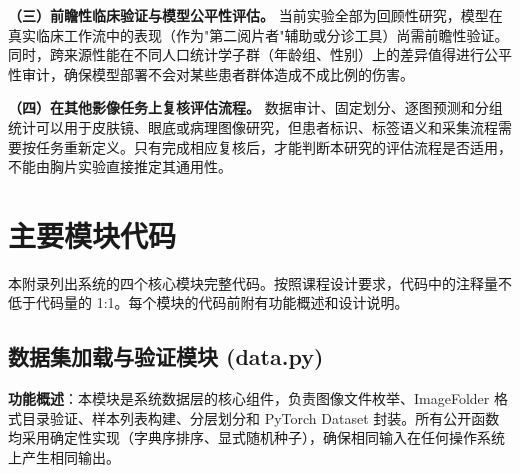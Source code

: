 \documentclass[12pt,a4paper,UTF8,openany]{ctexbook}
\begin{document}
\textbf{（三）前瞻性临床验证与模型公平性评估。} 当前实验全部为回顾性研究，模型在真实临床工作流中的表现（作为"第二阅片者"辅助或分诊工具）尚需前瞻性验证。同时，跨来源性能在不同人口统计学子群（年龄组、性别）上的差异值得进行公平性审计，确保模型部署不会对某些患者群体造成不成比例的伤害。

\textbf{（四）在其他影像任务上复核评估流程。} 数据审计、固定划分、逐图预测和分组统计可以用于皮肤镜、眼底或病理图像研究，但患者标识、标签语义和采集流程需要按任务重新定义。只有完成相应复核后，才能判断本研究的评估流程是否适用，不能由胸片实验直接推定其通用性。

\appendix

\chapter{主要模块代码}

本附录列出系统的四个核心模块完整代码。按照课程设计要求，代码中的注释量不低于代码量的 1:1。每个模块的代码前附有功能概述和设计说明。

\section{数据集加载与验证模块 (data.py)}

\textbf{功能概述}：本模块是系统数据层的核心组件，负责图像文件枚举、ImageFolder 格式目录验证、样本列表构建、分层划分和 PyTorch Dataset 封装。所有公开函数均采用确定性实现（字典序排序、显式随机种子），确保相同输入在任何操作系统上产生相同输出。
\end{document}
